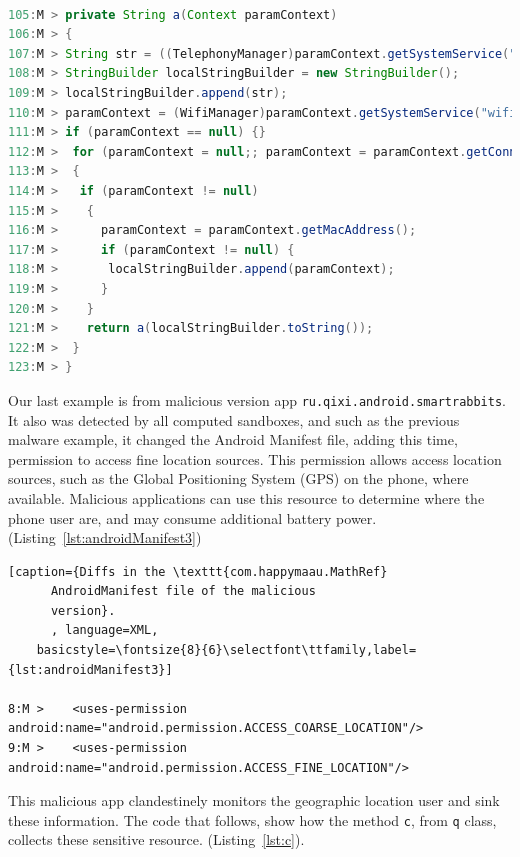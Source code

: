 \begin{lstlisting}[caption={Diffs in the malicious version
      of the class \texttt{com.mn.vymq.b.d}
      (app \texttt{com.happymaau.MathRef})},
      language=Java, basicstyle=\fontsize{8}{6}\selectfont\ttfamily,
      label={lst:d}]

105:M > private String a(Context paramContext)
106:M > {
107:M >	String str = ((TelephonyManager)paramContext.getSystemService("phone")).getDeviceId();
108:M > StringBuilder localStringBuilder = new StringBuilder();
109:M > localStringBuilder.append(str);
110:M > paramContext = (WifiManager)paramContext.getSystemService("wifi");
111:M > if (paramContext == null) {}
112:M >  for (paramContext = null;; paramContext = paramContext.getConnectionInfo())
113:M >  {
114:M >   if (paramContext != null)
115:M >    {
116:M >      paramContext = paramContext.getMacAddress();
117:M >      if (paramContext != null) {
118:M >       localStringBuilder.append(paramContext);
119:M >      }
120:M >    }
121:M >    return a(localStringBuilder.toString());
122:M >  }
123:M > }
\end{lstlisting}

Our last example is from malicious version app \texttt{ru.qixi.android.smartrabbits}. It also was detected by all computed sandboxes, and such as the previous malware example, it changed the Android Manifest file, adding this time, permission to access fine location sources. This permission allows access location sources, such as the Global Positioning System (GPS) on the phone, where available. Malicious applications can use this resource to determine where the phone user are, and may consume additional battery power. (Listing~\ref{lst:androidManifest3})

\begin{lstlisting}[caption={Diffs in the \texttt{com.happymaau.MathRef}
      AndroidManifest file of the malicious
      version}.
      , language=XML,
    basicstyle=\fontsize{8}{6}\selectfont\ttfamily,label={lst:androidManifest3}]

8:M >    <uses-permission android:name="android.permission.ACCESS_COARSE_LOCATION"/>
9:M >    <uses-permission android:name="android.permission.ACCESS_FINE_LOCATION"/>
\end{lstlisting}

This malicious app clandestinely monitors the geographic location user and sink these information. The code that follows, show how the method \texttt{c}, from \texttt{q} class, collects these sensitive resource. (Listing~\ref{lst:c}).

